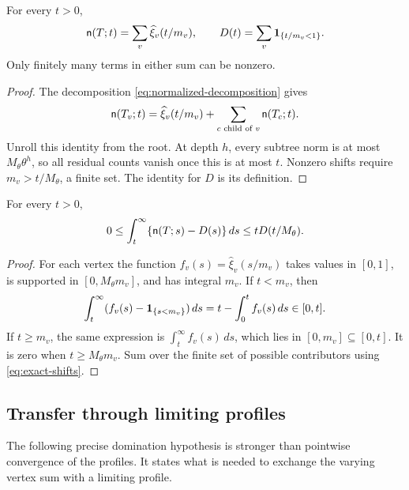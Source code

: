 \begin{proposition}\label{prop:exact-shifts}
For every $t>0$,
\begin{equation}\label{eq:exact-shifts}
 \mathsf n(T;t)=\sum_v\widehat\xi_v(t/m_v),
 \qquad
 D(t)=\sum_v\mathbf 1_{\{t/m_v<1\}}.
\end{equation}
Only finitely many terms in either sum can be nonzero.
\end{proposition}
\begin{proof}
The decomposition \eqref{eq:normalized-decomposition} gives
\[
 \mathsf n(T_v;t)=\widehat\xi_v(t/m_v)
                 +\sum_{c\text{ child of }v}\mathsf n(T_c;t).
\]
Unroll this identity from the root. At depth $h$, every subtree norm is
at most $M_\theta\theta^h$, so all residual counts vanish once this is
at most $t$. Nonzero shifts require $m_v>t/M_\theta$, a finite set.
The identity for $D$ is its definition.
\end{proof}

\begin{proposition}\label{prop:integrated}
For every $t>0$,
\begin{equation}\label{eq:integrated-bound}
 0\le\int_t^\infty\{\mathsf n(T;s)-D(s)\}\,ds
 \le tD(t/M_\theta).
\end{equation}
\end{proposition}
\begin{proof}
For each vertex the function
$f_v(s)=\widehat\xi_v(s/m_v)$ takes values in $[0,1]$, is supported in
$[0,M_\theta m_v]$, and has integral $m_v$.
If $t<m_v$, then
\[
 \int_t^\infty(f_v(s)-\mathbf 1_{\{s<m_v\}})\,ds
 =t-\int_0^t f_v(s)\,ds\in[0,t].
\]
If $t\ge m_v$, the same expression is $\int_t^\infty f_v(s)\,ds$,
which lies in $[0,m_v]\subseteq[0,t]$. It is zero when
$t\ge M_\theta m_v$. Sum over the finite set of possible contributors
using \eqref{eq:exact-shifts}.
\end{proof}

\subsection{Transfer through limiting profiles}
The following precise domination hypothesis is stronger than pointwise
convergence of the profiles. It states what is needed to exchange the
varying vertex sum with a limiting profile.

